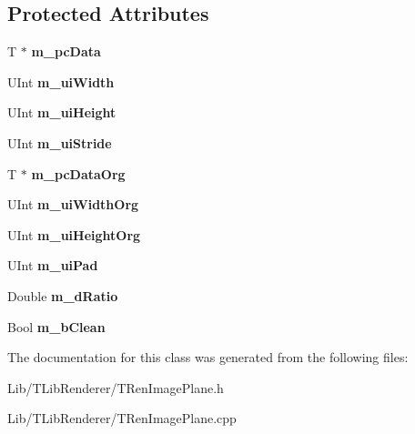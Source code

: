 \subsection*{Protected Attributes}
\begin{DoxyCompactItemize}
\item 
\mbox{\label{class_t_ren_image_plane_ab4b2da70f05bfa0a12ea12fd0ea9a321}} 
T $\ast$ {\bfseries m\+\_\+pc\+Data}
\item 
\mbox{\label{class_t_ren_image_plane_a9a5e5ad21e1e8ff5d5379e4f81207ab5}} 
U\+Int {\bfseries m\+\_\+ui\+Width}
\item 
\mbox{\label{class_t_ren_image_plane_a99098a5882012ebb8d864b487158c139}} 
U\+Int {\bfseries m\+\_\+ui\+Height}
\item 
\mbox{\label{class_t_ren_image_plane_a3164ce440876ea482d72346811a43d32}} 
U\+Int {\bfseries m\+\_\+ui\+Stride}
\item 
\mbox{\label{class_t_ren_image_plane_a418d68a4933e6fd9b032b090a16fe516}} 
T $\ast$ {\bfseries m\+\_\+pc\+Data\+Org}
\item 
\mbox{\label{class_t_ren_image_plane_a2284164bba1c47d2a017b158dd667e94}} 
U\+Int {\bfseries m\+\_\+ui\+Width\+Org}
\item 
\mbox{\label{class_t_ren_image_plane_a7ddfeb00b01eb7320c90eae0149fb101}} 
U\+Int {\bfseries m\+\_\+ui\+Height\+Org}
\item 
\mbox{\label{class_t_ren_image_plane_a11effb13abc50a607ac723e42de4946c}} 
U\+Int {\bfseries m\+\_\+ui\+Pad}
\item 
\mbox{\label{class_t_ren_image_plane_aa859600a93ab28fa6ebf62b76d7cfd5b}} 
Double {\bfseries m\+\_\+d\+Ratio}
\item 
\mbox{\label{class_t_ren_image_plane_abdcb0c059ab30237ebc150a2b449bbd5}} 
Bool {\bfseries m\+\_\+b\+Clean}
\end{DoxyCompactItemize}


The documentation for this class was generated from the following files\+:\begin{DoxyCompactItemize}
\item 
Lib/\+T\+Lib\+Renderer/T\+Ren\+Image\+Plane.\+h\item 
Lib/\+T\+Lib\+Renderer/T\+Ren\+Image\+Plane.\+cpp\end{DoxyCompactItemize}
